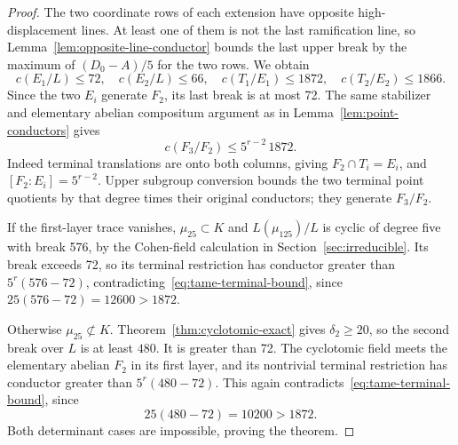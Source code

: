 \begin{proof}
The two coordinate rows of each extension have opposite high-displacement lines. At least one of them is not the last ramification line, so Lemma~\ref{lem:opposite-line-conductor} bounds the last upper break by the maximum of $(D_0-A)/5$ for the two rows. We obtain
\[
 c(E_1/L)\le72,\quad c(E_2/L)\le66,\quad
 c(T_1/E_1)\le1872,\quad c(T_2/E_2)\le1866.
\]
Since the two $E_i$ generate $F_2$, its last break is at most 72. The same stabilizer and elementary abelian compositum argument as in Lemma~\ref{lem:point-conductors} gives
\begin{equation}\label{eq:tame-terminal-bound}
                       c(F_3/F_2)\le5^{r-2}\,1872.
\end{equation}
Indeed terminal translations are onto both columns, giving $F_2\cap T_i=E_i$, and $[F_2:E_i]=5^{r-2}$. Upper subgroup conversion bounds the two terminal point quotients by that degree times their original conductors; they generate $F_3/F_2$.

If the first-layer trace vanishes, $\mu_{25}\subset K$ and $L(\mu_{125})/L$ is cyclic of degree five with break 576, by the Cohen-field calculation in Section~\ref{sec:irreducible}. Its break exceeds 72, so its terminal restriction has conductor greater than $5^r(576-72)$, contradicting~\eqref{eq:tame-terminal-bound}, since $25(576-72)=12600>1872$.

Otherwise $\mu_{25}\not\subset K$. Theorem~\ref{thm:cyclotomic-exact} gives $\delta_2\ge20$, so the second break over $L$ is at least $480$. It is greater than 72. The cyclotomic field meets the elementary abelian $F_2$ in its first layer, and its nontrivial terminal restriction has conductor greater than $5^r(480-72)$. This again contradicts~\eqref{eq:tame-terminal-bound}, since
\[
                         25(480-72)=10200>1872.
\]
Both determinant cases are impossible, proving the theorem.
\end{proof}
